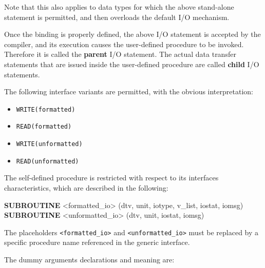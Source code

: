 \documentclass[]{scrartcl}
\newenvironment{Shaded}{}{}
\newcommand{\KeywordTok}[1]{\textcolor[rgb]{0.00,0.44,0.13}{\textbf{#1}}}
\newcommand{\NormalTok}[1]{#1}
\newcommand{\OperatorTok}[1]{\textcolor[rgb]{0.40,0.40,0.40}{#1}}
\providecommand{\tightlist}{%
  \setlength{\itemsep}{0pt}\setlength{\parskip}{0pt}}
\begin{document}
Note that this also applies to data types for which the above
stand-alone statement is permitted, and then overloads the default I/O
mechanism.

Once the binding is properly defined, the above I/O statement is
accepted by the compiler, and its execution causes the user-defined
procedure to be invoked. Therefore it is called the \textbf{parent} I/O
statement. The actual data transfer statements that are issued inside
the user-defined procedure are called \textbf{child} I/O statements.

The following interface variants are permitted, with the obvious
interpretation:

\begin{itemize}
\tightlist
\item
  \texttt{WRITE(formatted)}
\item
  \texttt{READ(formatted)}
\item
  \texttt{WRITE(unformatted)}
\item
  \texttt{READ(unformatted)}
\end{itemize}

The self-defined procedure is restricted with respect to its
interfaces\textquotesingle{} characteristics, which are described in the
following:

\begin{Shaded}
\begin{Highlighting}[]
\KeywordTok{SUBROUTINE} \OperatorTok{\textless{}}\NormalTok{formatted\_io}\OperatorTok{\textgreater{}}\NormalTok{   (dtv, unit, iotype, v\_list, iostat, iomsg)}
\KeywordTok{SUBROUTINE} \OperatorTok{\textless{}}\NormalTok{unformatted\_io}\OperatorTok{\textgreater{}}\NormalTok{ (dtv, unit,                 iostat, iomsg)}
\end{Highlighting}
\end{Shaded}

The placeholders \texttt{\textless{}formatted\_io\textgreater{}} and
\texttt{\textless{}unformatted\_io\textgreater{}} must be replaced by a
specific procedure name referenced in the generic interface.

The dummy arguments\textquotesingle{} declarations and meaning are:
\end{document}
